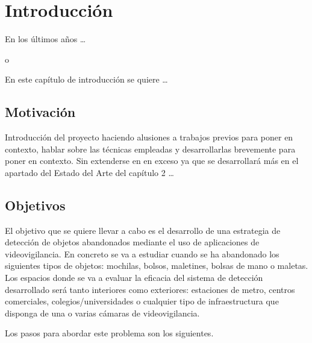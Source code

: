 
\chapter{Introducción}
\label{cha:introduccion}

En los últimos años \ldots

o

En este capítulo de introducción se quiere \ldots

\section{Motivación}
\label{sec:motivacion}

Introducción del proyecto haciendo alusiones a trabajos previos para poner en contexto, hablar sobre las técnicas empleadas y desarrollarlas brevemente para poner en contexto. Sin extenderse en en exceso ya que se desarrollará más en el apartado del Estado del Arte del capítulo 2 \ldots

\section{Objetivos}
\label{sec:objetivos}

El objetivo que se quiere llevar a cabo es el desarrollo de una estrategia de detección de objetos abandonados mediante el uso de aplicaciones de videovigilancia. En concreto se va a estudiar cuando se ha abandonado los siguientes tipos de objetos: mochilas, bolsos, maletines, bolsas de mano o maletas. Los espacios donde se va a evaluar la eficacia del sistema de detección desarrollado será tanto interiores como exteriores: estaciones de metro, centros comerciales, colegios/universidades o cualquier tipo de infraestructura que disponga de una o varias cámaras de videovigilancia. 

Los pasos para abordar este problema son los siguientes.


